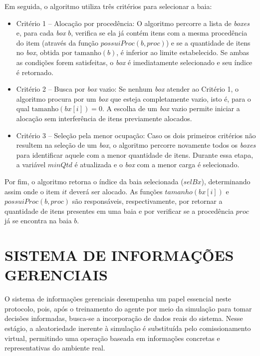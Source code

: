 \documentclass[
    12pt,                %
    openright,           %
    oneside,             %
    a4paper,             %
    english,             %
    spanish,             %
    brazil               %
]{ufscar}
\begin{document}
Em seguida, o algoritmo utiliza três critérios para selecionar a baia:
\begin{itemize}
    \item Critério 1 – Alocação por procedência:
    O algoritmo percorre a lista de \textit{boxes} e, para cada \textit{box} \(b\), verifica se ela já contém itens com a mesma procedência do item (através da função \(possuiProc(b, proc)\)) e se a quantidade de itens no \textit{box}, obtida por \(\text{tamanho}(b)\), é inferior ao limite estabelecido. Se ambas as condições forem satisfeitas, o \textit{box} é imediatamente selecionado e seu índice é retornado. 

    \item Critério 2 – Busca por \textit{box} vazio: 
    Se nenhum \textit{box} atender ao Critério 1, o algoritmo procura por um \textit{box} que esteja completamente vazio, isto é, para o qual \(\text{tamanho}(bx[i]) = 0\). A escolha de um \textit{box} vazio permite iniciar a alocação sem interferência de itens previamente alocados.

    \item Critério 3 – Seleção pela menor ocupação:  
    Caso os dois primeiros critérios não resultem na seleção de um \textit{box}, o algoritmo percorre novamente todos os \textit{boxes} para identificar aquele com a menor quantidade de itens. Durante essa etapa, a variável \(minQtd\) é atualizada e o \textit{box} com a menor carga é selecionado.
\end{itemize}

Por fim, o algoritmo retorna o índice da baia selecionada (\(selBx\)), determinando assim onde o item \(it\) deverá ser alocado. As funções \(tamanho(bx[i])\) e \(possuiProc(b, proc)\) são responsáveis, respectivamente, por retornar a quantidade de itens presentes em uma baia e por verificar se a procedência \(proc\) já se encontra na baia \(b\). 

\chapter{SISTEMA DE INFORMAÇÕES GERENCIAIS}

O sistema de informações gerenciais desempenha um papel essencial neste protocolo, pois, após o treinamento do agente por meio da simulação para tomar decisões informadas, busca-se a incorporação de dados reais do sistema. Nesse estágio, a aleatoriedade inerente à simulação é substituída pelo comissionamento virtual, permitindo uma operação baseada em informações concretas e representativas do ambiente real.
\end{document}
